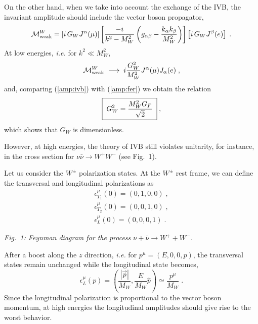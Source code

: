 \documentclass[12pt]{report}
\def\text#1{{\scriptstyle\mathrm{#1}}}
\begin{document}
On the other hand, when we take into account the exchange of the IVB,
the invariant amplitude should include the vector boson propagator,
\[
{\cal M}_{\text{weak}}^W = \left[ i \, G_W J^{\alpha}{(\mu)}
\right]
\left[\frac{-i}{k^2 - M_W^2}\left( g_{\alpha\beta} -
\frac{k_\alpha k_\beta}{M_W^2}\right)
\right] \left[ i \, G_W J^{\beta}{(e)} \right] \; .
\]
At low energies, {\it i.e.} for $k^2 \ll M_W^2$,
\begin{equation}
{\cal M}_{\text{weak}}^W \; \longrightarrow \; 
i \frac{G_W^2}{M_W^2} J^{\alpha}{(\mu)} J_{\alpha} (e) \; , 
\label{amp:ivb}
\end{equation}
and, comparing (\ref{amp:ivb}) with (\ref{amp:fer}) we obtain the relation
\begin{equation}
\fbox{$ \; \displaystyle{G_W^2 = \frac{M_W^2 G_F}{\sqrt{2}}} \; $} \; ,
\label{gw}
\end{equation}
which shows that $G_W$ is dimensionless.

However, at high energies, the theory of IVB still violates unitarity,
for instance, in the cross section for  $\nu \bar{\nu} \to W^+ W^-$
(see Fig.\ 1).

Let us consider the $W^\pm$ polarization states. At the $W^\pm$ rest
frame, we can define the transversal and longitudinal polarizations as
\begin{eqnarray*} 
\epsilon^\mu_{T_1} (0) = (0,1,0,0) \; , \\
\epsilon^\mu_{T_2} (0) = (0,0,1,0) \; , \\
\epsilon^\mu_{L} (0)   = (0,0,0,1) \; . 
\end{eqnarray*}

\begin{figure}[ht]
\protect
\epsfxsize=10cm
\begin{center}
\centerline{}
\end{center}
\end{figure}
\nobreak 
\begin{minipage}[h]{12cm}
\begin{center}
\centerline{\it Fig.\ 1: Feynman diagram for the process $\nu +
\bar{\nu} \to W^+ + W^-$.}
\end{center}
\end{minipage}

After a boost along the $z$ direction, {\it i.e.} for $p^\mu = (E,
0,0, p)$, the transversal states remain unchanged while the
longitudinal state becomes,
\[
\epsilon^\mu_{L} (p) = \left(\frac{|\vec{p}|}{M_W},
\frac{E}{M_W}\hat{p} \right) 
\simeq \frac{p^\mu}{M_W} \; .
\]
Since the longitudinal polarization is proportional to the vector
boson momentum, at high energies the longitudinal amplitudes should
give rise to the worst behavior. 
\end{document}

